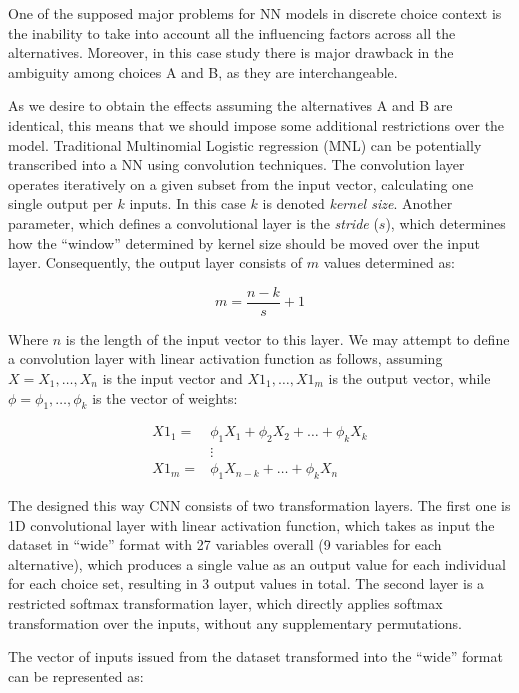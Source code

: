 \documentclass[12pt,]{article}
\begin{document}
One of the supposed major problems for NN models in discrete choice
context is the inability to take into account all the influencing
factors across all the alternatives. Moreover, in this case study there
is major drawback in the ambiguity among choices A and B, as they are
interchangeable.

As we desire to obtain the effects assuming the alternatives A and B are
identical, this means that we should impose some additional restrictions
over the model. Traditional Multinomial Logistic regression (MNL) can be
potentially transcribed into a NN using convolution techniques. The
convolution layer operates iteratively on a given subset from the input
vector, calculating one single output per \(k\) inputs. In this case
\(k\) is denoted \emph{kernel size}. Another parameter, which defines a
convolutional layer is the \emph{stride} (\(s\)), which determines how
the ``window'' determined by kernel size should be moved over the input
layer. Consequently, the output layer consists of \(m\) values
determined as:

\begin{equation}
m = \frac{n - k}{s} + 1
\end{equation}

Where \(n\) is the length of the input vector to this layer. We may
attempt to define a convolution layer with linear activation function as
follows, assuming \(X = X_1, \dots, X_n\) is the input vector and
\(X1_1, \dots, X1_m\) is the output vector, while
\(\phi = \phi_1, \dots, \phi_k\) is the vector of weights:

\begin{align}
X1_1 = & \phi_1 X_1 + \phi_2 X_2 + \dots + \phi_k X_k \nonumber \\
& \vdots \\
X1_m = & \phi_1 X_{n-k} + \dots + \phi_k X_n \nonumber
\end{align}

The designed this way CNN consists of two transformation layers. The
first one is 1D convolutional layer with linear activation function,
which takes as input the dataset in ``wide'' format with 27 variables
overall (9 variables for each alternative), which produces a single
value as an output value for each individual for each choice set,
resulting in 3 output values in total. The second layer is a restricted
softmax transformation layer, which directly applies softmax
transformation over the inputs, without any supplementary permutations.

The vector of inputs issued from the dataset transformed into the
``wide'' format can be represented as:
\end{document}
